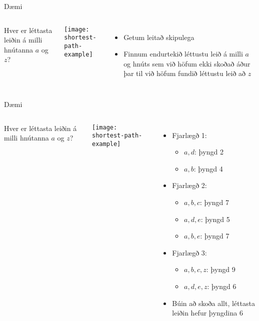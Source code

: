 \documentclass[handout]{beamer}
\begin{document}
\begin{frame}{Dæmi}
\begin{columns}
Hver er léttasta leiðin á milli hnútanna $a$ og $z$?
\begin{center}
\texttt{[image: shortest-path-example]}
\end{center}
\begin{itemize}
 \item Getum leitað skipulega
 \item Finnum endurtekið léttustu leið á milli $a$ og hnúts sem við höfum ekki skoðað áður þar til við höfum fundið léttustu leið að $z$
\end{itemize}
\end{columns}
\end{frame}

\begin{frame}{Dæmi}
\begin{columns}
Hver er léttasta leiðin á milli hnútanna $a$ og $z$?
\begin{center}
\texttt{[image: shortest-path-example]}
\end{center}
\begin{itemize}
 \item Fjarlægð 1:
 \begin{itemize}
  \item $a, d$: þyngd 2
  \item $a, b$: þyngd 4
 \end{itemize} \pause
 \item Fjarlægð 2:
 \begin{itemize}
  \item $a, b, c$: þyngd 7
  \item $a, d, e$: þyngd 5
  \item $a, b, e$: þyngd 7
 \end{itemize} \pause
 \item Fjarlægð 3:
 \begin{itemize}
  \item $a, b, c, z$: þyngd 9
  \item $a, d, e, z$: þyngd 6
 \end{itemize}
 \item Búin að skoða allt, léttasta leiðin hefur þyngdina 6
\end{itemize}
\end{columns}
\end{frame}
\end{document}
